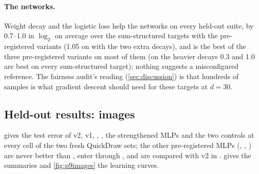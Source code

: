 \paragraph{The networks.} Weight decay and the logistic loss help the networks on every held-out suite, by 0.7--1.0 in $\log_2$ on average over the sum-structured targets with the pre-registered variants (1.05 on  with the two extra decays), and  is the best of the three pre-registered variants on most of them (on  the heavier decays 0.3 and 1.0 are best on every sum-structured target); nothing suggests a misconfigured reference. The fairness audit's reading (\cref{sec:discussion}) is that hundreds of samples is what gradient descent should need for these targets at $d=30$.


\subsection{Held-out results: images}\label{sec:p9images}

 gives the test error of v2, v1, , , the strengthened MLPs and the two controls at every cell of the two fresh QuickDraw sets; the other pre-registered MLPs (, , ) are never better than , enter through , and are compared with v2 in .  gives the summaries and \cref{fig:p9images} the learning curves.

\begin{table}[t]
\centering\scriptsize\setlength{\tabcolsep}{3.2pt}

\caption{Test error (\%) on the held-out QuickDraw sets (pixel-permuted; seed mean, seed 0 at $n\ge30000$;  and the controls seed 0 only). Bold: the lowest error among v2 and the references (every column but the per-cell minima ,  and the two controls). The control  is permutation-invariant like v2, and at , $n=60000$ its 14.7 is below the bold 14.8;  uses the pixel layout.  is the pre-registered per-cell hindsight minimum over Part 8's MLP variants;  adds ,  and .  is  given v2's pooled sums as extra inputs (a control);  sees the unpermuted pixels (context, not a reference).}
\label{tab:p9images}
\end{table}

